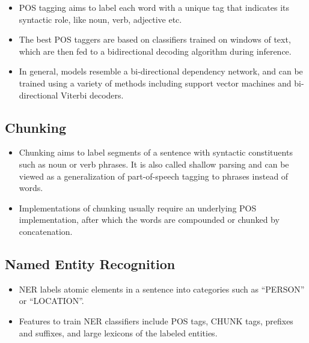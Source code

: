 \documentclass[11pt,a4paper]{article}
\begin{document}
    \begin{itemize}
      \item
      POS tagging aims to label each word with a unique tag that indicates its syntactic role, like noun, verb, adjective etc.
      \item
      The best POS taggers are based on classifiers trained on windows of text, which are then fed to a bidirectional decoding algorithm during inference.
      \item
      In general, models resemble a bi-directional dependency network, and can be trained using a variety of methods including support vector machines and bi-directional Viterbi decoders.
    \end{itemize}


  \subsection{Chunking} %
  \label{sub:chunking}

    \begin{itemize}
      \item
      Chunking aims to label segments of a sentence with syntactic constituents such as noun or verb phrases. It is also called shallow parsing and can be viewed as a generalization of part-of-speech tagging to phrases instead of words.
      \item
      Implementations of chunking usually require an underlying POS implementation, after which the words are compounded or chunked by concatenation.
    \end{itemize}


  \subsection{Named Entity Recognition} %
  \label{sub:named_entity_recognition}

    \begin{itemize}
      \item
      NER labels atomic elements in a sentence into categories such as “PERSON” or “LOCATION”.
      \item
      Features to train NER classifiers include POS tags, CHUNK tags, prefixes and suffixes, and large lexicons of the labeled entities.
    \end{itemize}
\end{document}
